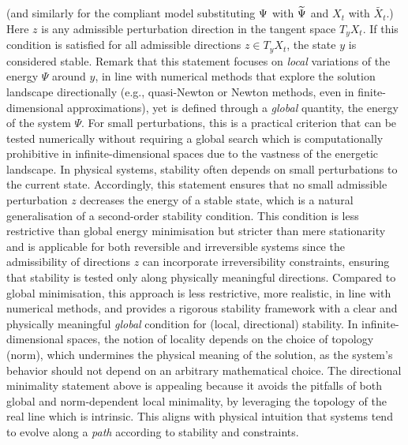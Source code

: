 (and similarly for the compliant model substituting $\Psi$ with $\widetilde\Psi$ and $X_t$ with $\widetilde{X_t}$.) {
        Here $z$ is any admissible perturbation direction in the tangent space $T_y X_t$. If this condition is satisfied for all admissible directions $z \in T_y X_t$, the state $y$ is considered stable.
        Remark that this statement focuses on \emph{local} variations of the energy $\Psi$ around $y$, in line with numerical methods that explore the solution landscape directionally (e.g., quasi-Newton or Newton methods, even in finite-dimensional approximations), yet is defined through a \emph{global} quantity, the energy of the system $\Psi$.
        For small perturbations, this is a practical criterion that can be tested numerically without requiring a global search which is computationally prohibitive in infinite-dimensional spaces due to the vastness of the energetic landscape.
        In physical systems, stability often depends on small perturbations to the current state. Accordingly, this statement ensures that no small admissible perturbation $z$ decreases the energy of a stable state, which is a natural generalisation of a second-order stability condition.
        This
        condition is less restrictive than global energy minimisation but stricter than mere stationarity and is applicable for both reversible and irreversible systems since the admissibility of directions $z$ can incorporate irreversibility constraints, ensuring that stability is tested only along physically meaningful directions.
        Compared to global minimisation, this approach is less restrictive, more realistic, in line with numerical methods, and provides a rigorous stability framework with a clear and physically meaningful \emph{global} condition for (local, directional) stability.
        In infinite-dimensional spaces, the notion of locality depends on the choice of topology (norm), which undermines the physical meaning of the solution, as the system’s behavior should not depend on an arbitrary mathematical choice.
        The directional minimality statement above is appealing because it avoids the pitfalls of both global and norm-dependent local minimality, by leveraging the topology of the real line which is intrinsic. This aligns with physical intuition that systems tend to evolve along a \emph{path} according to stability and constraints.
    }




